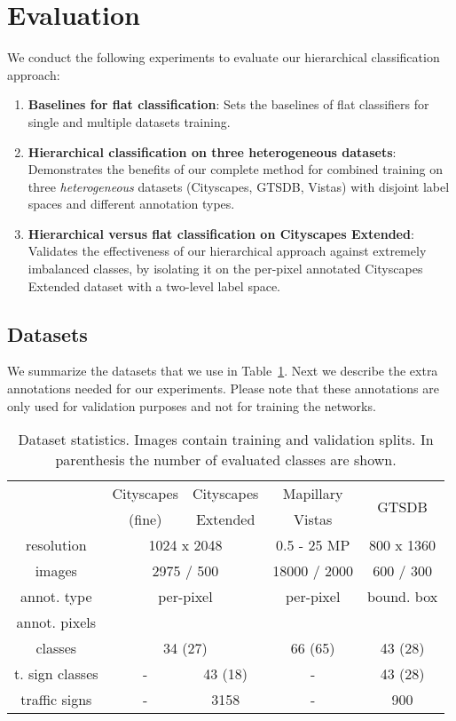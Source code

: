 \documentclass[letterpaper, 10 pt, conference]{ieeeconf}
\begin{document}
\section{Evaluation}
\label{sec:evaluation}
We conduct the following experiments to evaluate our hierarchical classification approach:
\begin{enumerate}
\item \textbf{Baselines for flat classification}: Sets the baselines of flat classifiers for single and multiple datasets training.
\item \textbf{Hierarchical classification on three heterogeneous datasets}: Demonstrates the benefits of our complete method for combined training on three \textit{heterogeneous} datasets (Cityscapes, GTSDB, Vistas) with disjoint label spaces and different annotation types.
\item \textbf{Hierarchical versus flat classification on Cityscapes Extended}: Validates the effectiveness of our hierarchical approach against extremely imbalanced classes, by isolating it on the per-pixel annotated Cityscapes Extended dataset with a two-level label space.
\end{enumerate}


\subsection{Datasets}
\label{subsec:datasets-generation}
We summarize the datasets that we use in Table~\ref{tab:datasets}. Next we describe the extra annotations needed for our experiments. Please note that these annotations are only used for validation purposes and not for training the networks.

\begin{table}[b]
\setlength\tabcolsep{4.0pt}
	\caption{Dataset statistics. Images contain training and validation splits. In parenthesis the number of evaluated classes are shown.}
	\label{tab:datasets}
	\begin{center}
		\begin{tabular}{c|c|c|c|c}
			& Cityscapes & Cityscapes & Mapillary & \multirow{2}{*}{GTSDB}\\
			& (fine) & Extended & Vistas &\\
			\hline
			resolution & \multicolumn{2}{c|}{1024 x 2048} & 0.5 - 25 MP & 800 x 1360\\
			\hline
			images & \multicolumn{2}{c|}{2975 / 500} & 18000 / 2000 & 600 / 300\\
			\hline
			annot. type & \multicolumn{2}{c|}{per-pixel} & per-pixel & bound. box\\
			\hline
			annot. pixels & \multicolumn{2}{c|}{} & {} & \\
			\hline
			classes & \multicolumn{2}{c|}{34 (27)} & 66 (65) & 43 (28) \\
			\hline
			t. sign classes & - & 43 (18) & - & 43 (28)\\
			\hline
			traffic signs & - & 3158 & - & 900\\
		\end{tabular}
	\end{center}
\end{table}
\end{document}
